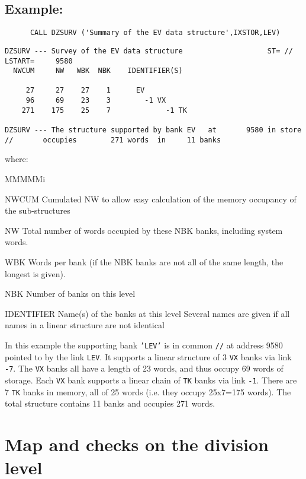 \subsection{Example:}
\begin{verbatim}
      CALL DZSURV ('Summary of the EV data structure',IXSTOR,LEV)
\end{verbatim}
\begin{Listing}\begin{verbatim}
DZSURV --- Survey of the EV data structure                    ST= //        LSTART=     9580
  NWCUM     NW   WBK  NBK    IDENTIFIER(S)
 
     27     27    27    1      EV
     96     69    23    3        -1 VX
    271    175    25    7             -1 TK
 
DZSURV --- The structure supported by bank EV   at       9580 in store //       occupies        271 words  in     11 banks
\end{verbatim}\end{Listing}
where:
\begin{DL}{MMMMMi}
\item[NWCUM]Cumulated NW to allow easy calculation of
the memory occupancy of the sub-structures
\item[NW]Total number of words occupied by these NBK banks,
including system words.
\item[WBK]Words per bank (if the NBK banks are not all
of the same length, the longest is given).
\item[NBK]Number of banks on this level
\item[IDENTIFIER]Name(s) of the banks at this level
\newline Several names are given if all names
in a linear structure are not identical
\end{DL}
\par In this example
the supporting bank {\tt'LEV'} is in common {\tt//} at address
9580 pointed to by the link {\tt LEV}.
It supports a linear structure of 3 {\tt VX} banks via link {\tt -7}.
The {\tt VX} banks all
have a length of 23 words, and thus occupy 69 words of storage.
Each {\tt VX} bank supports a linear chain of
{\tt TK} banks via link {\tt -1}.
There are 7 {\tt TK} banks in memory, all of 25 words
(i.e. they occupy 25x7=175 words).
The total structure contains 11 banks and occupies 271 words.
\section{Map and checks on the division level}
